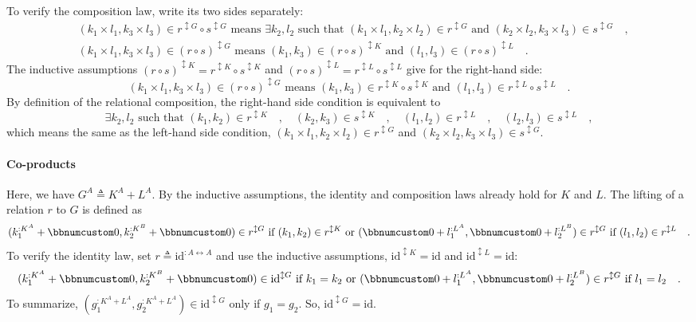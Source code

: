 To verify the composition law, write its two sides separately:
\begin{align*}
 & (k_{1}\times l_{1},k_{3}\times l_{3})\in r^{\updownarrow G}\circ s^{\updownarrow G}\text{ means }\exists k_{2},l_{2}\text{ such that }(k_{1}\times l_{1},k_{2}\times l_{2})\in r^{\updownarrow G}\text{ and }(k_{2}\times l_{2},k_{3}\times l_{3})\in s^{\updownarrow G}\quad,\\
 & (k_{1}\times l_{1},k_{3}\times l_{3})\in(r\circ s)^{\updownarrow G}\text{ means }(k_{1},k_{3})\in(r\circ s)^{\updownarrow K}\text{ and }(l_{1},l_{3})\in(r\circ s)^{\updownarrow L}\quad.
\end{align*}
The inductive assumptions $(r\circ s)^{\updownarrow K}=r^{\updownarrow K}\circ s^{\updownarrow K}$
and $(r\circ s)^{\updownarrow L}=r^{\updownarrow L}\circ s^{\updownarrow L}$
give for the right-hand side:
\[
(k_{1}\times l_{1},k_{3}\times l_{3})\in(r\circ s)^{\updownarrow G}\text{ means }(k_{1},k_{3})\in r^{\updownarrow K}\circ s^{\updownarrow K}\text{ and }(l_{1},l_{3})\in r^{\updownarrow L}\circ s^{\updownarrow L}\quad.
\]
By definition of the relational composition, the right-hand side condition
is equivalent to
\[
\exists k_{2},l_{2}\text{ such that }(k_{1},k_{2})\in r^{\updownarrow K}\quad,\quad(k_{2},k_{3})\in s^{\updownarrow K}\quad,\quad(l_{1},l_{2})\in r^{\updownarrow L}\quad,\quad(l_{2},l_{3})\in s^{\updownarrow L}\quad,
\]
which means the same as the left-hand side condition, $(k_{1}\times l_{1},k_{2}\times l_{2})\in r^{\updownarrow G}$
and $(k_{2}\times l_{2},k_{3}\times l_{3})\in s^{\updownarrow G}$.

\paragraph{Co-products}

Here, we have $G^{A}\triangleq K^{A}+L^{A}$. By the inductive assumptions,
the identity and composition laws already hold for $K$ and $L$.
The lifting of a relation $r$ to $G$ is defined as
\[
(k_{1}^{:K^{A}}+\bbnum 0,k_{2}^{:K^{B}}+\bbnum 0)\in r^{\updownarrow G}\text{ if }(k_{1},k_{2})\in r^{\updownarrow K}\text{ or }(\bbnum 0+l_{1}^{:L^{A}},\bbnum 0+l_{2}^{:L^{B}})\in r^{\updownarrow G}\text{ if }(l_{1},l_{2})\in r^{\updownarrow L}\quad.
\]
To verify the identity law, set $r\triangleq\text{id}^{:A\leftrightarrow A}$
and use the inductive assumptions, $\text{id}^{\updownarrow K}=\text{id}$
and $\text{id}^{\updownarrow L}=\text{id}$:
\[
(k_{1}^{:K^{A}}+\bbnum 0,k_{2}^{:K^{B}}+\bbnum 0)\in\text{id}^{\updownarrow G}\text{ if }k_{1}=k_{2}\text{ or }(\bbnum 0+l_{1}^{:L^{A}},\bbnum 0+l_{2}^{:L^{B}})\in r^{\updownarrow G}\text{ if }l_{1}=l_{2}\quad.
\]
To summarize, $(g_{1}^{:K^{A}+L^{A}},g_{2}^{:K^{A}+L^{A}})\in\text{id}^{\updownarrow G}$
only if $g_{1}=g_{2}$. So, $\text{id}^{\updownarrow G}=\text{id}$.


